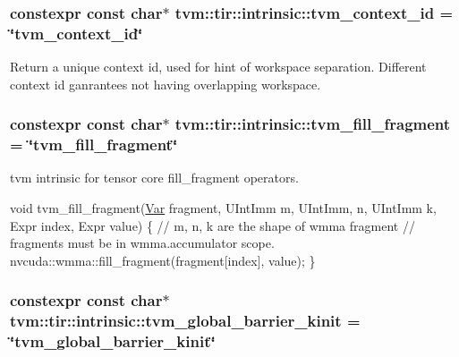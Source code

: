 \subsubsection[{\texorpdfstring{tvm\+\_\+context\+\_\+id}{tvm_context_id}}]{\setlength{\rightskip}{0pt plus 5cm}constexpr const char$\ast$ tvm\+::tir\+::intrinsic\+::tvm\+\_\+context\+\_\+id = \char`\"{}tvm\+\_\+context\+\_\+id\char`\"{}}\hypertarget{namespacetvm_1_1tir_1_1intrinsic_af3a86e8446b1f2b078597cb7cdadfbff}{}\label{namespacetvm_1_1tir_1_1intrinsic_af3a86e8446b1f2b078597cb7cdadfbff}


Return a unique context id, used for hint of workspace separation. Different context id ganrantees not having overlapping workspace. 

\subsubsection[{\texorpdfstring{tvm\+\_\+fill\+\_\+fragment}{tvm_fill_fragment}}]{\setlength{\rightskip}{0pt plus 5cm}constexpr const char$\ast$ tvm\+::tir\+::intrinsic\+::tvm\+\_\+fill\+\_\+fragment = \char`\"{}tvm\+\_\+fill\+\_\+fragment\char`\"{}}\hypertarget{namespacetvm_1_1tir_1_1intrinsic_a6c0862848e3eb5b6972c76f0b27585f9}{}\label{namespacetvm_1_1tir_1_1intrinsic_a6c0862848e3eb5b6972c76f0b27585f9}


tvm intrinsic for tensor core fill\+\_\+fragment operators. 

void tvm\+\_\+fill\+\_\+fragment(\hyperlink{classtvm_1_1tir_1_1Var}{Var} fragment, U\+Int\+Imm m, U\+Int\+Imm, n, U\+Int\+Imm k, Expr index, Expr value) \{ // m, n, k are the shape of wmma fragment // fragments must be in \textquotesingle{}wmma.\+accumulator\textquotesingle{} scope. nvcuda\+::wmma\+::fill\+\_\+fragment(fragment\mbox{[}index\mbox{]}, value); \} 
\subsubsection[{\texorpdfstring{tvm\+\_\+global\+\_\+barrier\+\_\+kinit}{tvm_global_barrier_kinit}}]{\setlength{\rightskip}{0pt plus 5cm}constexpr const char$\ast$ tvm\+::tir\+::intrinsic\+::tvm\+\_\+global\+\_\+barrier\+\_\+kinit = \char`\"{}tvm\+\_\+global\+\_\+barrier\+\_\+kinit\char`\"{}}\hypertarget{namespacetvm_1_1tir_1_1intrinsic_a7ccada41188e0161827169ce24a6db16}{}\label{namespacetvm_1_1tir_1_1intrinsic_a7ccada41188e0161827169ce24a6db16}


